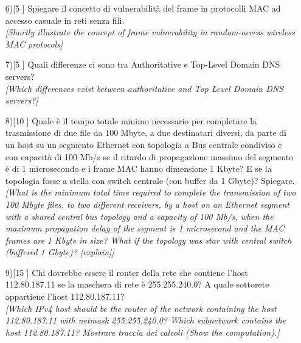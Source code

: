 \documentclass[a4paper, 12pt]{article}
\begin{document}
\begin{enumerate}
    \newpage
    
    \item[6)[5]] Spiegare il concetto di vulnerabilità del frame in protocolli MAC ad accesso casuale in reti senza fili. \\
    \textit{[Shortly illustrate the concept of frame vulnerability in random-access wireless MAC protocols]}
    
    \vspace{4cm}

    \item[7)[5]] Quali differenze ci sono tra Authoritative e Top-Level Domain DNS servers? \\
    \textit{[Which differences exist between authoritative and Top Level Domain DNS servers?]}
    \vspace{4cm}
    
    \item[8)[10]] Quale è il tempo totale minimo necessario per completare la trasmissione di due file da 100 Mbyte, a due destinatari diversi, da parte di un host su un segmento Ethernet con topologia a Bus centrale condiviso e con capacità di 100 Mb/s se il ritardo di propagazione massimo del segmento è di 1 microsecondo e i frame MAC hanno dimensione 1 Kbyte? E se la topologia fosse a stella con switch centrale (con buffer da 1 Gbyte)? Spiegare. \\
    \textit{[What is the minimum total time required to complete the transmission of two 100 Mbyte files, to two different receivers, by a host on an Ethernet segment with a shared central bus topology and a capacity of 100 Mb/s, when the maximum propagation delay of the segment is 1 microsecond and the MAC frames are 1 Kbyte in size? What if the topology was star with central switch (buffered 1 Gbyte)? [explain]]}
    \vspace{4cm}

    \newpage

    \item[9)[15]] Chi dovrebbe essere il router della rete che contiene l'host 112.80.187.11 se la maschera di rete è 255.255.240.0? A quale sottorete appartiene l'host 112.80.187.11? \\
    \textit{[Which IPv4 host should be the router of the network containing the host 112.80.187.11 with netmask 255.255.240.0? Which subnetwork contains the host 112.80.187.11? Mostrare traccia dei calcoli (Show the computation).]}
    
    \vspace{2cm}
    

\end{enumerate}
\end{document}
